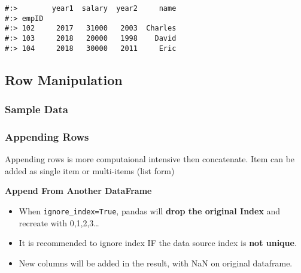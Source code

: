 \documentclass[
]{book}
\providecommand{\tightlist}{%
  \setlength{\itemsep}{0pt}\setlength{\parskip}{0pt}}
\begin{document}
\begin{verbatim}
#:>        year1  salary  year2     name
#:> empID                               
#:> 102     2017   31000   2003  Charles
#:> 103     2018   20000   1998    David
#:> 104     2018   30000   2011     Eric
\end{verbatim}

\hypertarget{row-manipulation}{%
\subsection{Row Manipulation}\label{row-manipulation}}

\hypertarget{sample-data-9}{%
\subsubsection{Sample Data}\label{sample-data-9}}

\hypertarget{appending-rows}{%
\subsubsection{Appending Rows}\label{appending-rows}}

Appending rows is more computaional intensive then concatenate. Item can be added as single item or multi-items (list form)

\textbf{Append From Another DataFrame}

\begin{itemize}
\tightlist
\item
  When \texttt{ignore\_index=True}, pandas will \textbf{drop the original Index} and recreate with 0,1,2,3\ldots{}\\
\item
  It is recommended to ignore index IF the data source index is \textbf{not unique}.\\
\item
  New columns will be added in the result, with NaN on original dataframe.
\end{itemize}
\end{document}
